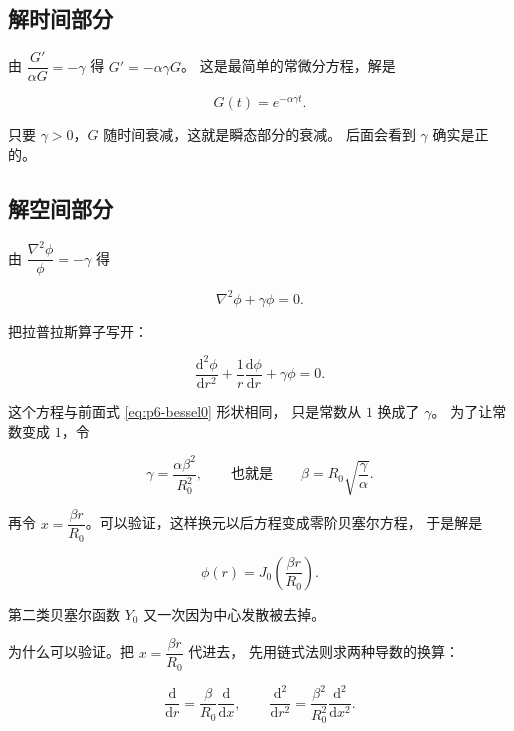 \subsection{解时间部分}

由 $\dfrac{G'}{\alpha G}=-\gamma$ 得 $G'=-\alpha\gamma G$。
这是最简单的常微分方程，解是

\begin{equation}
G(t)=e^{-\alpha\gamma t}.
\label{eq:p6-G}
\end{equation}

只要 $\gamma>0$，$G$ 随时间衰减，这就是瞬态部分的衰减。
后面会看到 $\gamma$ 确实是正的。

\subsection{解空间部分}

由 $\dfrac{\nabla^2\phi}{\phi}=-\gamma$ 得

\begin{equation}
\nabla^2\phi+\gamma\phi=0 .
\end{equation}

把拉普拉斯算子写开：

\begin{equation}
\frac{\mathrm{d}^2\phi}{\mathrm{d}r^2}+\frac{1}{r}\frac{\mathrm{d}\phi}{\mathrm{d}r}+\gamma\phi=0 .
\end{equation}

这个方程与前面式 \eqref{eq:p6-bessel0} 形状相同，
只是常数从 $1$ 换成了 $\gamma$。
为了让常数变成 $1$，令

\begin{equation}
\gamma=\frac{\alpha\beta^2}{R_0^2},
\qquad\text{也就是}\qquad
\beta=R_0\sqrt{\frac{\gamma}{\alpha}} .
\label{eq:p6-gamma}
\end{equation}

再令 $x=\dfrac{\beta r}{R_0}$。可以验证，这样换元以后方程变成零阶贝塞尔方程，
于是解是

\begin{equation}
\phi(r)=J_0\!\left(\frac{\beta r}{R_0}\right).
\end{equation}

第二类贝塞尔函数 $Y_0$ 又一次因为中心发散被去掉。

为什么可以验证。把 $x=\dfrac{\beta r}{R_0}$ 代进去，
先用链式法则求两种导数的换算：

\begin{equation}
\frac{\mathrm{d}}{\mathrm{d}r}=\frac{\beta}{R_0}\frac{\mathrm{d}}{\mathrm{d}x},
\qquad
\frac{\mathrm{d}^2}{\mathrm{d}r^2}=\frac{\beta^2}{R_0^2}\frac{\mathrm{d}^2}{\mathrm{d}x^2}.
\end{equation}

